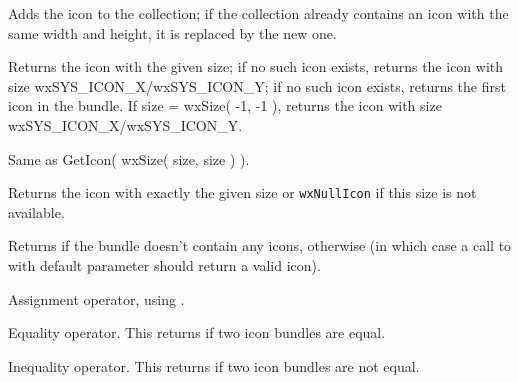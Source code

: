 
Adds the icon to the collection; if the collection already
contains an icon with the same width and height, it is
replaced by the new one.


\label{wxiconbundlegeticon}


Returns the icon with the given size; if no such icon exists,
returns the icon with size wxSYS\_ICON\_X/wxSYS\_ICON\_Y;
if no such icon exists,
returns the first icon in the bundle. If size = wxSize( -1, -1 ),
returns the icon with size wxSYS\_ICON\_X/wxSYS\_ICON\_Y.


Same as GetIcon( wxSize( size, size ) ).


\label{wxiconbundlegeticonofexactsize}


Returns the icon with exactly the given size or \texttt{wxNullIcon} if this
size is not available.


\label{wxiconbundleisempty}


Returns \true if the bundle doesn't contain any icons, \false otherwise (in
which case a call to  with default
parameter should return a valid icon).


\label{wxiconbundleoperatorassign}


Assignment operator, using .


\label{wxiconbundleoperatorequals}


Equality operator. This returns \true if two icon bundles are equal.


\label{wxiconbundleoperatornotequals}


Inequality operator. This returns \true if two icon bundles are not equal.
